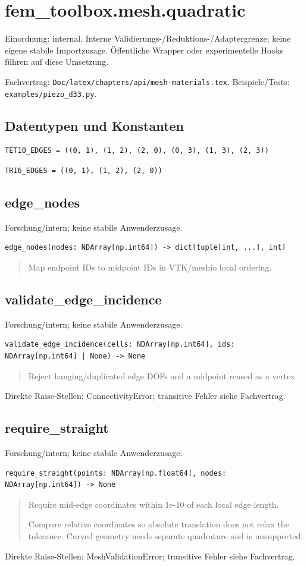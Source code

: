 \section{fem\_toolbox.mesh.quadratic}
Einordnung: internal. Interne Validierungs-/Reduktions-/Adaptergrenze; keine eigene stabile Importzusage. Öffentliche Wrapper oder experimentelle Hooks führen auf diese Umsetzung.
\par Fachvertrag: \nolinkurl{Doc/latex/chapters/api/mesh-materials.tex}. Beispiele/Tests:
\nolinkurl{examples/piezo_d33.py}.
\subsection*{Datentypen und Konstanten}
\begin{lstlisting}
TET10_EDGES = ((0, 1), (1, 2), (2, 0), (0, 3), (1, 3), (2, 3))
\end{lstlisting}
\begin{lstlisting}
TRI6_EDGES = ((0, 1), (1, 2), (2, 0))
\end{lstlisting}
\subsection{edge\_nodes}
Forschung/intern; keine stabile Anwenderzusage.
\begin{lstlisting}
edge_nodes(nodes: NDArray[np.int64]) -> dict[tuple[int, ...], int]
\end{lstlisting}
\begin{quote}
Map endpoint IDs to midpoint IDs in VTK/meshio local ordering.
\end{quote}
\subsection{validate\_edge\_incidence}
Forschung/intern; keine stabile Anwenderzusage.
\begin{lstlisting}
validate_edge_incidence(cells: NDArray[np.int64], ids: NDArray[np.int64] | None) -> None
\end{lstlisting}
\begin{quote}
Reject hanging/duplicated edge DOFs and a midpoint reused as a vertex.
\end{quote}
Direkte Raise-Stellen: ConnectivityError; transitive Fehler siehe Fachvertrag.
\subsection{require\_straight}
Forschung/intern; keine stabile Anwenderzusage.
\begin{lstlisting}
require_straight(points: NDArray[np.float64], nodes: NDArray[np.int64]) -> None
\end{lstlisting}
\begin{quote}
Require mid-edge coordinates within 1e-10 of each local edge length.\par Compare relative coordinates so absolute translation does not relax the tolerance. Curved geometry needs separate quadrature and is unsupported.
\end{quote}
Direkte Raise-Stellen: MeshValidationError; transitive Fehler siehe Fachvertrag.
